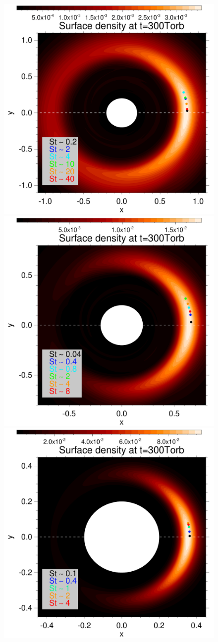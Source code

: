 \documentclass[a4paper,usenatbib]{mnras}
\begin{document}
\begin{figure}
\centering
\includegraphics[width=0.85\hsize]{f1a.pdf}
\includegraphics[width=0.85\hsize]{f1b.pdf}
\includegraphics[width=0.85\hsize]{f1c.pdf}

\end{figure}
\end{document}
